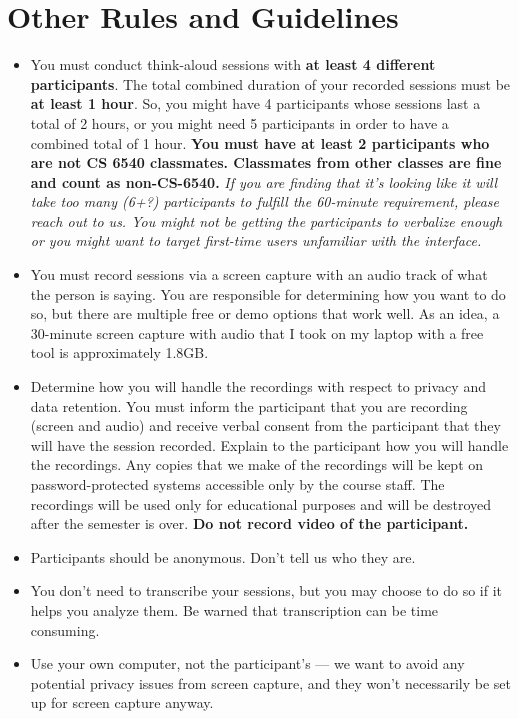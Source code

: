 \documentclass{article}
\begin{document}
\section{Other Rules and Guidelines}
\begin{itemize}
    \item You must conduct think-aloud sessions with \textbf{at least 4 different participants}. The total combined duration of your recorded sessions must be \textbf{at least 1 hour}. So, you might have 4 participants whose sessions last a total of 2 hours, or you might need 5 participants in order to have a combined total of 1 hour. \textbf{You must have at least 2 participants who are not CS 6540 classmates. Classmates from other classes are fine and count as non-CS-6540.} \textit{If you are finding that it's looking like it will take too many (6+?) participants to fulfill the 60-minute requirement, please reach out to us. You might not be getting the participants to verbalize enough or you might want to target first-time users unfamiliar with the interface.}
    
    \item You must record sessions via a screen capture with an audio track of what the person is saying. You are responsible for determining how you want to do so, but there are multiple free or demo options that work well. As an idea, a 30-minute screen capture with audio that I took on my laptop with a free tool is approximately 1.8GB. 
    
    \item Determine how you will handle the recordings with respect to privacy and data retention. You must inform the participant that you are recording (screen and audio) and receive verbal consent from the participant that they will have the session recorded. Explain to the participant how you will handle the recordings. Any copies that we make of the recordings will be kept on password-protected systems accessible only by the course staff. The recordings will be used only for educational purposes and will be destroyed after the semester is over. \textbf{Do not record video of the participant.}

    \item Participants should be anonymous. Don't tell us who they are.

    \item You don't need to transcribe your sessions, but you may choose to do so if it helps you analyze them. Be warned that transcription can be time consuming.

    \item Use your own computer, not the participant's --- we want to avoid any potential privacy issues from screen capture, and they won't necessarily be set up for screen capture anyway.
    
\end{itemize}
\end{document}
